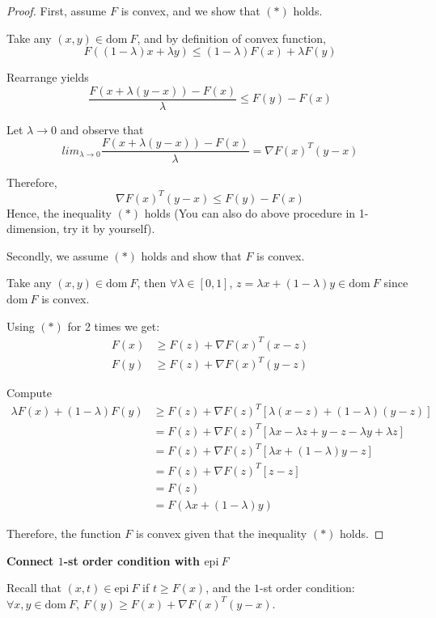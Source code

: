 \begin{proof}
First, assume $F$ is convex, and we show that $(*)$ holds. 

Take any $(x,y)\in \text{dom}\ F$, and by definition of convex function,
$$F((1-\lambda)x+\lambda y) \leq (1-\lambda)F(x) + \lambda F(y)$$

Rearrange yields
$$\frac{F(x+\lambda(y-x)) - F(x)}{\lambda} \leq F(y) - F(x)$$

Let $\lambda \rightarrow 0$ and observe that
$$lim_{\lambda\rightarrow 0} \frac{F(x+\lambda(y-x)) - F(x)}{\lambda} = \nabla F(x)^T(y-x)$$

Therefore,
$$\nabla F(x)^T(y-x)\leq F(y) - F(x)$$
Hence, the inequality $(*)$ holds (You can also do above procedure in 1-dimension, try it by yourself).


Secondly, we assume $(*)$ holds and show that $F$ is convex.

Take any $(x,y)\in \text{dom}\ F$, then $\forall \lambda\in[0,1]$, $z= \lambda x + (1-\lambda)y \in \text{dom}\ F$ since $\text{dom}\ F$ is convex.

Using $(*)$ for 2 times we get:
\begin{align*}
F(x) &\geq F(z) + \nabla F(x)^T(x-z)\\
F(y) &\geq F(z) + \nabla F(x)^T(y-z)
\end{align*} 

Compute
\begin{align*}
\lambda F(x)+(1-\lambda)F(y) &\geq F(z) + \nabla F(z)^T[\lambda (x-z)+(1-\lambda)(y-z)]\\
&= F(z) + \nabla F(z)^T[\lambda x - \lambda z + y - z - \lambda y +\lambda z]\\
&= F(z) + \nabla F(z)^T[\lambda x + (1-\lambda)y - z]\\
&= F(z) + \nabla F(z)^T[z - z]\\
&= F(z)\\
&= F(\lambda x + (1-\lambda )y)
\end{align*}

Therefore, the function $F$ is convex given that the inequality $(*)$ holds.
\end{proof}

\vspace{0.3cm}
\noindent\textbf{Connect $1$-st order condition with $\text{epi}\ F$}

Recall that $(x,t)\in \text{epi}\ F$ if $t\geq F(x)$, and the $1$-st order condition: $\forall x,y \in \text{dom}\ F$, $F(y)\geq F(x) + \nabla F(x)^T(y-x)$.

